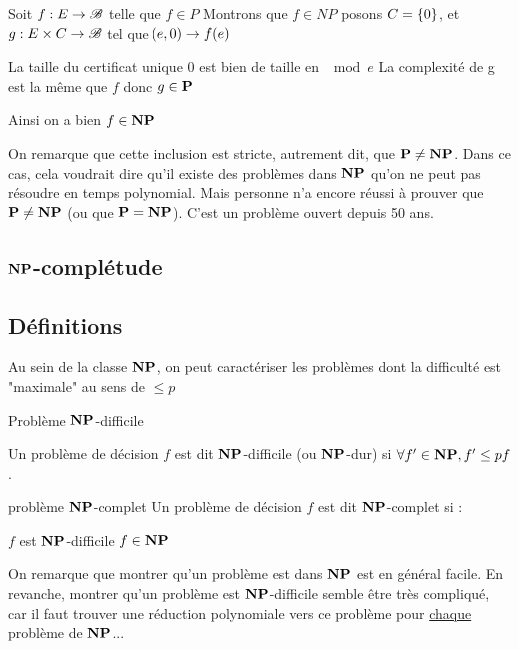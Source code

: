 \documentclass[a4paper,french,bookmarks]{book}
\newcommand{\cP}{\bbP}
\newcommand{\cNP}{\bbN\bbP}
\begin{document}
  \begin{nproof}
      Soit $f : E \to \mathscr{B}$ telle que $f \in P$
      Montrons que $f \in NP$
      posons $C = \left\{0\right\}$, et $g : E \times C \to \mathscr{B}$ tel que $\!\left(e, 0\right) \to f\!\left(e\right)$
      \begin{enumerate}
          \itt La taille du certificat unique 0 est bien de taille en $\mod e$
          \itt La complexité de g est la même que $f$ donc $g\in \cP$
      \end{enumerate}
        Ainsi on a bien $f \in \cNP$
  \end{nproof}
    On remarque que cette inclusion est stricte, autrement dit, que $\cP \neq \cNP$.
    Dans ce cas, cela voudrait dire qu'il existe des problèmes dans $\cNP$ qu'on ne peut pas résoudre en temps polynomial.
    Mais personne n'a encore réussi à prouver que $\cP \neq \cNP$ (ou que $\cP = \cNP$).
  C'est un problème ouvert depuis 50 ans.

    \subsection{$\cNP$-complétude}

\subsection{Définitions}

    Au sein de la classe $\cNP$, on peut caractériser les problèmes dont la difficulté est "maximale" au sens de $\leq p$

    \begin{definition}{Problème $\cNP$-difficile}{}

        Un problème de décision $f$ est dit $\cNP$-difficile (ou $\cNP$-dur)
        si $\forall f' \in \cNP, f' \leq pf$.
        
    \end{definition}

    \begin{definition}{problème $\cNP$-complet}{}
        Un problème de décision $f$ est dit $\cNP$-complet si :
        \begin{enumerate}
            \itt $f$ est $\cNP$-difficile
            \itt $f \in \cNP$
        \end{enumerate}
    \end{definition}

    On remarque que montrer qu'un problème est dans $\cNP$ est en général facile.
    En revanche, montrer qu'un problème est $\cNP$-difficile semble être très compliqué, car il faut trouver une réduction polynomiale vers ce problème pour \underline{chaque} problème de $\cNP$...
\end{document}
